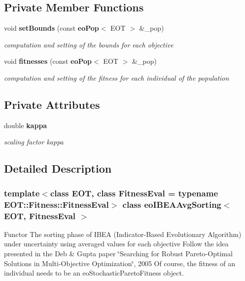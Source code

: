 \subsection*{Private Member Functions}
\begin{CompactItemize}
\item 
void {\bf set\-Bounds} (const {\bf eo\-Pop}$<$ EOT $>$ \&\_\-pop)
\begin{CompactList}\small\item\em computation and setting of the bounds for each objective \item\end{CompactList}\item 
void {\bf fitnesses} (const {\bf eo\-Pop}$<$ EOT $>$ \&\_\-pop)
\begin{CompactList}\small\item\em computation and setting of the fitness for each individual of the population \item\end{CompactList}\end{CompactItemize}
\subsection*{Private Attributes}
\begin{CompactItemize}
\item 
double {\bf kappa}\label{classeoIBEAAvgSorting_6f467d673861830d6a0708f61cecc3f7}

\begin{CompactList}\small\item\em scaling factor kappa \item\end{CompactList}\end{CompactItemize}


\subsection{Detailed Description}
\subsubsection*{template$<$class EOT, class Fitness\-Eval = typename EOT::Fitness::Fitness\-Eval$>$ class eo\-IBEAAvg\-Sorting$<$ EOT, Fitness\-Eval $>$}

Functor The sorting phase of IBEA (Indicator-Based Evolutionary Algorithm) under uncertainty using averaged values for each objective Follow the idea presented in the Deb \& Gupta paper \char`\"{}Searching for Robust Pareto-Optimal Solutions in Multi-Objective Optimization\char`\"{}, 2005 Of course, the fitness of an individual needs to be an eo\-Stochastic\-Pareto\-Fitness object. 



